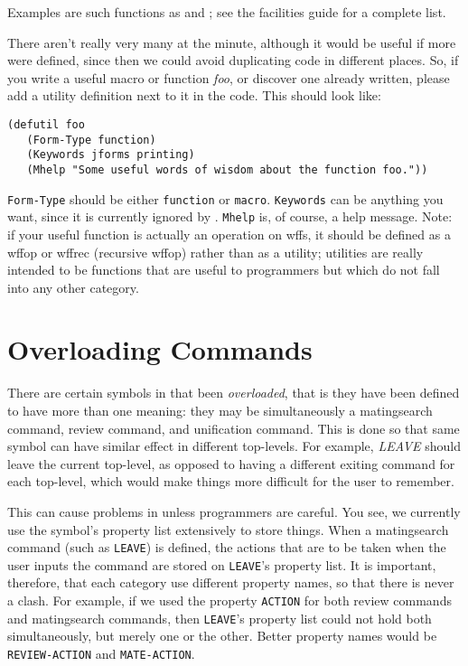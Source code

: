 Examples are such functions as  and ; see the
facilities guide for a complete list.

There aren't really very many 
at the minute, although it would be useful if more were defined, since then we could
avoid duplicating code in different places. So, if you write a useful macro or 
function {\it foo}, or discover one already written, please add a utility 
definition next to it in the code. This should look like:

\begin{verbatim}
(defutil foo
   (Form-Type function)
   (Keywords jforms printing)
   (Mhelp "Some useful words of wisdom about the function foo."))
\end{verbatim}

{\tt Form-Type} should be either {\tt function} or {\tt macro}. {\tt Keywords} can be anything
you want, since it is currently ignored by \tps. {\tt Mhelp} is, of course, a help message.
Note: if your useful function is actually an operation on wffs, it should be defined as
a wffop or wffrec (recursive wffop) rather than as a utility; utilities are really 
intended to be functions that are useful to \TPS programmers but which do not fall into 
any other \TPS category.

\section{Overloading Commands}

There are certain symbols in \TPS that been {\it overloaded}, that is
they have been defined to have more than one meaning: they may be
simultaneously a matingsearch command, review command, and unification
command. This is done so that same symbol can have similar effect in different
top-levels. For example, {\it LEAVE} should leave the current top-level, 
as opposed to having a different exiting command for each top-level,
which would make things more difficult for the user to remember.

This can cause problems in \TPS unless programmers are careful.  You
see, we currently use the symbol's property list extensively to store
things.  When a matingsearch command (such as {\tt LEAVE}) is defined,
the actions that are to be taken when the user inputs the command are
stored on {\tt LEAVE}'s property list.  It is important, therefore, that
each category use different property names, so that there is never a
clash.  For example, if we used the property {\tt ACTION} for both
review commands and matingsearch commands, then {\tt LEAVE}'s property
list could not hold both simultaneously, but merely one or the other.
Better property names would be {\tt REVIEW-ACTION} and {\tt MATE-ACTION}.

